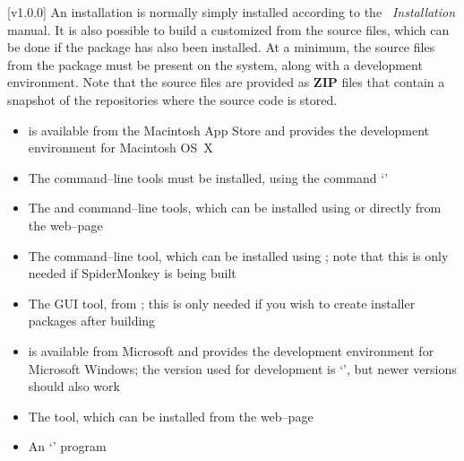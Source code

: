 [v1.0.0]
%
An \mplusm{} installation is normally simply installed according to the
\emph{\MMM{}~Installation} manual.
It is also possible to build a customized \mplusm{} from the source files, which can be
done if the  package has also been installed.
At a minimum, the source files from the  package must be present on the
system, along with a  development environment.
Note that the source files are provided as \textbf{ZIP} files that contain a snapshot of
the  repositories where the source code is stored.
\tertiaryEnd{}
\begin{itemize}
\item {} is available from the Macintosh App Store and provides the
 development environment for Macintosh OS~X
\item The  command--line tools must be installed, using the command
`'
\item The  and  command--line tools, which can be installed
using  or directly from the web--page
\item The  command--line tool, which can be installed using
; note that this is only needed if SpiderMonkey is being built
\item The  GUI tool, from
;
this is only needed if you wish to create installer packages after building \mplusm
\end{itemize}
\tertiaryEnd{}
\begin{itemize}
\item {} is available from Microsoft and provides the 
development environment for Microsoft Windows; the version used for development is
`', but newer versions should also
work
\item The  tool, which can be installed from the web--page
\item An `' program
\end{itemize}
